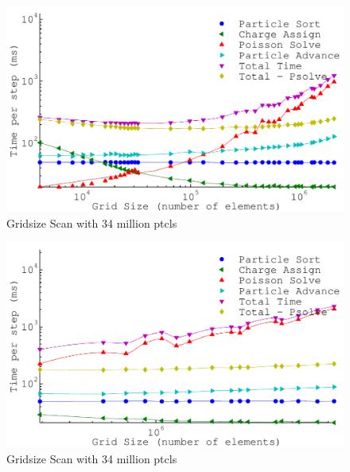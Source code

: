 \begin{figure}
\begin{center}
\includegraphics[width=6in]{performance/gridsize_scan34ptcls8bins.pdf}
\end{center}
\caption{Gridsize Scan with 34 million ptcls}
\label{fig:nptclsize_scan128x64x64}
\end{figure}

\begin{figure}
\begin{center}
\includegraphics[width=6in]{performance/gridsize_scan34ptcls16bins.pdf}
\end{center}
\caption{Gridsize Scan with 34 million ptcls}
\label{fig:nptclsize_scan128x64x64}
\end{figure}

